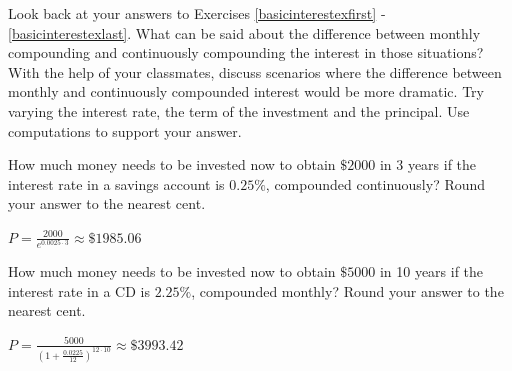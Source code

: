\documentclass{ximera}
\begin{document}
\begin{question}
\begin{problem}
\end{problem}

\end{question}

\begin{problem}
 Look back at your answers to Exercises \ref{basicinterestexfirst} - \ref{basicinterestexlast}. What can be said about the difference between monthly compounding and continuously compounding the interest in those situations?  With the help of your classmates, discuss scenarios where the difference between monthly  and continuously compounded interest would be more dramatic.  Try varying the interest rate, the term of the investment and the principal.  Use computations to support your answer.
\end{problem}

\begin{problem}
  How much money needs to be invested now to obtain $\$2000$ in 3 years if the interest rate in a savings account is $0.25 \%$, compounded continuously?  Round your answer to the nearest cent.

\begin{solution}
     $P = \frac{2000}{e^{0.0025 \cdot 3}} \approx \$ 1985.06$
\end{solution}
  
\end{problem}

\begin{problem}
  How much money needs to be invested now to obtain $\$5000$ in  10 years if the interest rate in a CD is $2.25 \%$, compounded monthly?  Round your answer to the nearest cent.

\begin{solution}
    $P = \frac{5000}{\left(1 + \frac{0.0225}{12}\right)^{12 \cdot 10}} \approx \$ 3993.42$
\end{solution}
  
\end{problem}
\end{document}
